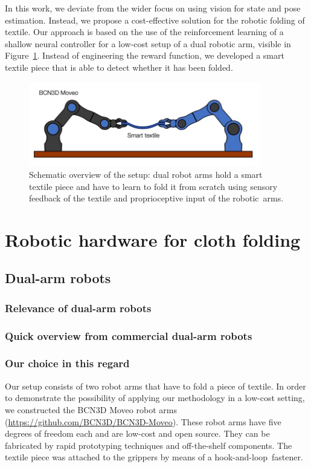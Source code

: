 \documentclass[\home/main.tex]{subfiles}
\begin{document}
In this work, we deviate from the wider focus on using vision for state and pose estimation. Instead, we propose a cost-effective solution for the robotic folding of textile. Our approach is based on the use of the reinforcement learning of a shallow neural controller for a low-cost setup of a dual robotic arm, visible in Figure~\ref{fig:setup_overview}. Instead of engineering the reward function, we developed a smart textile piece that is able to detect whether it has been folded.
\begin{figure}[H]
\centering
\includegraphics[width=0.9\textwidth, keepaspectratio]{figures/folding_overview_smaller.jpg}
\caption{Schematic overview of the setup: dual robot arms hold a smart textile piece and have to learn to fold it from scratch using sensory feedback of the textile and proprioceptive input of the robotic~arms. }
\label{fig:setup_overview}
\end{figure}


\section{Robotic hardware for cloth folding}

\subsection{Dual-arm robots}

\subsubsection{Relevance of dual-arm robots}

\subsubsection{Quick overview from commercial dual-arm robots}

\subsubsection{Our choice in this regard}
Our setup consists of two robot arms that have to fold a piece of textile. In order to demonstrate the possibility of applying our methodology in a low-cost setting, we constructed the BCN3D Moveo robot arms (\url{https://github.com/BCN3D/BCN3D-Moveo}). These robot arms have five degrees of freedom each and are low-cost and open source. They can be fabricated by rapid prototyping techniques and off-the-shelf components. The textile piece was attached to the grippers by means of a hook-and-loop~fastener.
\end{document}
